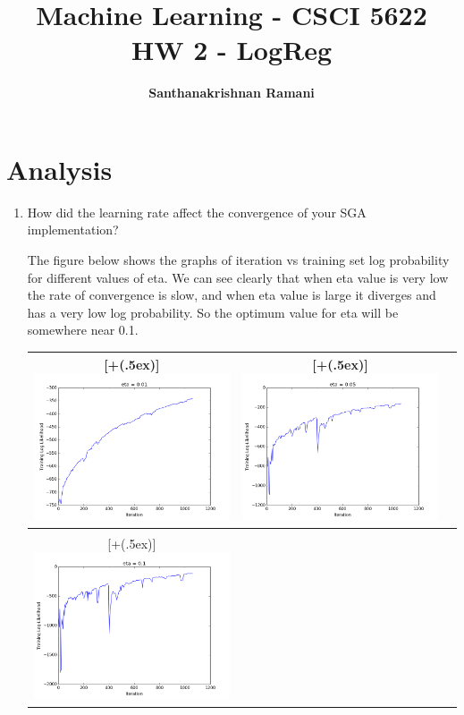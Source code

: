 \documentclass{article}
\date{\displaydate{date}}
\title{\textbf{Machine Learning - CSCI 5622} \\
HW 2 - LogReg}
\author{\textbf{Santhanakrishnan Ramani}}
\newcommand*{\addheight}[2][.5ex]{%
  \raisebox{0pt}[\dimexpr\height+(#1)\relax]{#2}%
}
\begin{document}
\maketitle

\section*{Analysis}

\begin{enumerate}
\item
How did the learning rate affect the convergence of your SGA implementation?

The figure below shows the graphs of iteration vs training set log probability for different values of eta. We can see clearly that when eta value is very low the rate of convergence is slow, and when eta value is large it diverges and has a very low log probability. So the optimum value for eta will be somewhere near 0.1. 
\begin{table}[H]
\centering
\begin{tabular}{|c|c|c|}
	\hline
	\addheight{\includegraphics[width=70mm]{images/pointNotOne.png}} &
	\addheight{\includegraphics[width=70mm]{images/pointNotFive.png}} \\
	\hline \\    
    \addheight{\includegraphics[width=70mm]{images/pointOne.png}} &

\end{tabular}
\end{table}
\end{enumerate}
\end{document}
